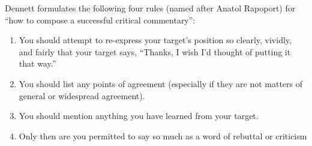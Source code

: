 Dennett formulates the following four rules (named after
Anatol Rapoport) for “how to compose a successful critical
commentary”:
\begin{enumerate}
\item You should attempt to re-express your target’s position so
clearly, vividly, and fairly that your target says, “Thanks, I
wish I’d thought of putting it that way.”
\item You should list any points of agreement (especially if they
are not matters of general or widespread agreement).
\item You should mention anything you have learned from your
target.
\item Only then are you permitted to say so much as a word of
rebuttal or criticism
\end{enumerate}


